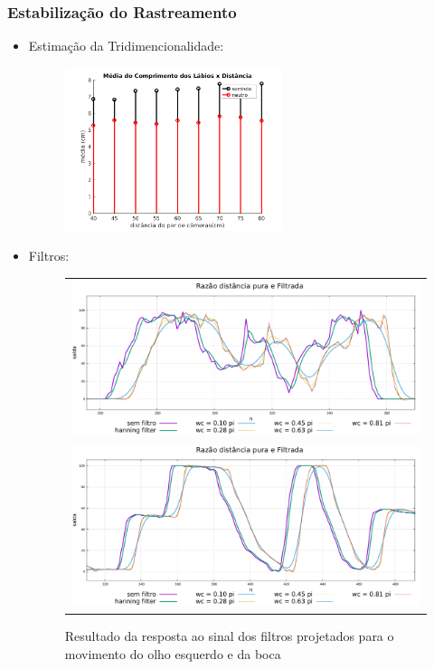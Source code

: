 \documentclass[brazil]{beamer}
\begin{document}
\begin{frame}
\frametitle{Estabilização do Rastreamento}
  \begin{itemize}
      \item Estimação da Tridimencionalidade:
      \begin{figure}
        \centering
        \includegraphics[width = 0.6\textwidth, keepaspectratio]{./img/media_3d.png}
      \end{figure}
               
  \end{itemize} 
\end{frame}

\begin{frame}
  \begin{itemize}
      \item Filtros:
      \begin{figure}
\centering
\begin{tabular}{c}
\includegraphics[width=0.6\linewidth]{./img/filter-result-left-eye.pdf} \\
\includegraphics[width=0.6\linewidth]{./img/filter-result-open-mouth.pdf} \\
\end{tabular}
\caption{Resultado da resposta ao sinal dos filtros projetados para o movimento do olho esquerdo e da boca}
\end{figure}
              
  \end{itemize} 
\end{frame}
\end{document}

